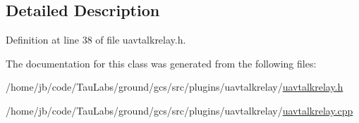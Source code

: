 \subsection{\-Detailed \-Description}


\-Definition at line 38 of file uavtalkrelay.\-h.



\-The documentation for this class was generated from the following files\-:\begin{DoxyCompactItemize}
\item 
/home/jb/code/\-Tau\-Labs/ground/gcs/src/plugins/uavtalkrelay/\hyperlink{uavtalkrelay_8h}{uavtalkrelay.\-h}\item 
/home/jb/code/\-Tau\-Labs/ground/gcs/src/plugins/uavtalkrelay/\hyperlink{uavtalkrelay_8cpp}{uavtalkrelay.\-cpp}\end{DoxyCompactItemize}
